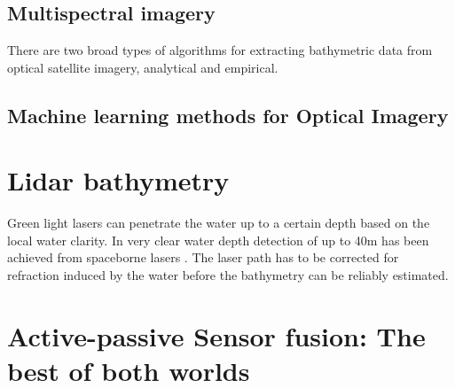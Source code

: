 \subsection{Multispectral imagery}

There are two broad types of algorithms for extracting bathymetric data from optical satellite imagery, analytical and empirical. 


\subsection{Machine learning methods for Optical Imagery}


\section{Lidar bathymetry}

Green light lasers can penetrate the water up to a certain depth based on the local water clarity. In very clear water depth detection of up to 40m has been achieved from spaceborne lasers \parencite{Parrish2019}. The laser path has to be corrected for refraction induced by the water before the bathymetry can be reliably estimated.

\section{Active-passive Sensor fusion: The best of both worlds}

